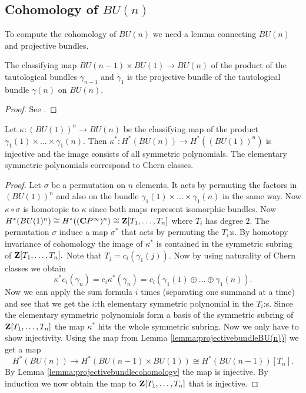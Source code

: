 \documentclass[a4paper,openany]{scrbook}
\begin{document}
\subsection{Cohomology of $BU(n)$}\label{subsec:cohomologyBU}

To compute the cohomology of $BU(n)$ we need a lemma connecting $BU(n)$ and projective bundles.

\begin{lemma}\label{lemma:projectivebundleBU(n))}
The classifying map $BU(n-1)\times BU(1)\rightarrow BU(n)$ of the product of the tautological bundles $\gamma_{n-1}$ and $\gamma_1$ is the projective bundle of the tautological bundle $\gamma(n)$ on $BU(n).$
\end{lemma}

\begin{proof}
See \cite[Theorem 19.3.1]{tomdieck:algebraic-topology}.
\end{proof}

\begin{thm}
Let $\kappa: (BU(1))^n \rightarrow BU(n)$ be the classifying map of the product $\gamma_1(1)\times \dots \times \gamma_1(n).$ Then $\kappa^*:H^*(BU(n)) \rightarrow H^*((BU(1))^n)$ is injective and the image consists of all symmetric polynomials. The elementary symmetric polynomials correspond to Chern classes.
\end{thm}

\begin{proof}
Let $\sigma$ be a permutation on $n$ elements. It acts by permuting the factors in $(BU(1))^n$ and also on the bundle $\gamma_1(1)\times \dots \times \gamma_1(n)$ in the same way. Now $\kappa \circ \sigma$ is homotopic to $\kappa$ since both maps represent isomorphic bundles. Now $H^*(BU(1)^n)\cong H^*((\mathbf C P^\infty)^n)\cong \mathbf Z [T_1,\dots,T_n]$ where $T_i$ has degree $2.$ The permutation $\sigma$ induce a map $\sigma^*$ that acts by permuting the $T_i$:s. By homotopy invariance of cohomology the image of $\kappa^*$ is contained in the symmetric subring of $\mathbf Z [T_1,\dots,T_n].$ Note that $T_j=c_i(\gamma_1(j)).$ Now by using naturality of Chern classes we obtain $$\kappa^*c_i(\gamma_n)=c_i\kappa^*(\gamma_n)=c_i(\gamma_1(1)\oplus \dots \oplus \gamma_1(n)).$$ Now we can apply the sum formula $i$ times (separating one summand at a time) and see that we get the $i$:th elementary symmetric polynomial in the $T_i$:s. Since the elementary symmetric polynomials form a basis of the symmetric subring of $\mathbf Z [T_1,\dots,T_n]$ the map $\kappa^*$ hits the whole symmetric subring. Now we only have to show injectivity. Using the map from Lemma \ref{lemma:projectivebundleBU(n))} we get a map $$H^*(BU(n))\rightarrow H^*(BU(n-1)\times BU(1))\cong H^*(BU(n-1))[T_n].$$ By Lemma \ref{lemma:projectivebundlecohomology} the map is injective. By induction we now obtain the map to $\mathbf Z [T_1,\dots,T_n]$ that is injective.
\end{proof}
\end{document}
